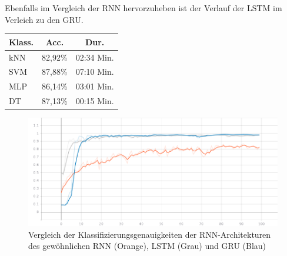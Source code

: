 Ebenfalls im Vergleich der RNN hervorzuheben ist der Verlauf der LSTM im Verleich zu den GRU. 

\begin{center}
    \begin{tabular}{| l | c | c |}
        \hline
        \textbf{Klass.} & \textbf{Acc.} & \textbf{Dur.} \\
        \hline
        kNN & 82,92\% & 02:34 Min.\\ \hline
        SVM & 87,88\% & 07:10 Min.\\ \hline
        MLP & 86,14\% & 03:01 Min.\\ \hline
        DT & 87,13\% & 00:15 Min.\\
        \hline
    \end{tabular}
\end{center}

\begin{figure}[h]
    \centering
    \includegraphics[scale=0.3]{grafiken/rnn-comp.png}
    \caption{Vergleich der Klassifizierungsgenauigkeiten der RNN-Architekturen des gewöhnlichen RNN (Orange), LSTM (Grau) und GRU (Blau)}
    \label{rnn-comp}
\end{figure}